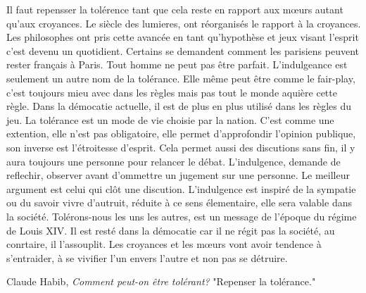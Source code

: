 \documentclass[12pt,a4paper]{article}
\begin{document}
\vspace{0.5 cm}

Il faut repensser la tolérence tant que cela reste en rapport aux mœurs autant qu’aux croyances. Le siècle des lumieres, ont réorganisés le rapport à la croyances.
Les philosophes ont pris cette avancée en tant qu’hypothèse et jeux visant l’esprit c’est devenu un quotidient. 
Certains se demandent comment les parisiens peuvent rester français à Paris. Tout homme  ne peut pas être parfait. 
L’indulgeance est seulement un autre nom de la tolérance. 
Elle même peut être comme le fair-play, c’est toujours mieu avec dans les règles mais pas tout le monde aquière cette règle. 
Dans la démocatie actuelle, il est de plus en plus utilisé dans les règles du jeu. 
La tolérance est un mode de vie choisie par la nation. 
C’est comme une extention, elle n’est pas obligatoire, elle permet d’approfondir l’opinion publique, son inverse est l’étroitesse d’esprit. 
Cela permet aussi des discutions sans fin, il y aura toujours une personne pour relancer le débat. 
L’indulgence, demande de reflechir, observer avant d’ommettre un jugement sur une personne. 
Le meilleur argument est celui qui clôt une discution. 
L’indulgence est inspiré de la sympatie ou du savoir vivre d’autruit, réduite à ce sens élementaire, elle sera valable dans la société. 
Tolérons-nous les uns les autres, est un message de l’époque du régime de Louis XIV. 
Il est resté dans la démocatie car il ne régit pas la société, au conrtaire, il l’assouplit. 
Les croyances et les mœurs vont avoir tendence à s’entraider, à se vivifier l’un envers l’autre et non pas se détruire.\par
\begin{center}
Claude Habib, \textit{Comment peut-on être tolérant?} "Repenser la tolérance."
\end{center}
\end{document}
